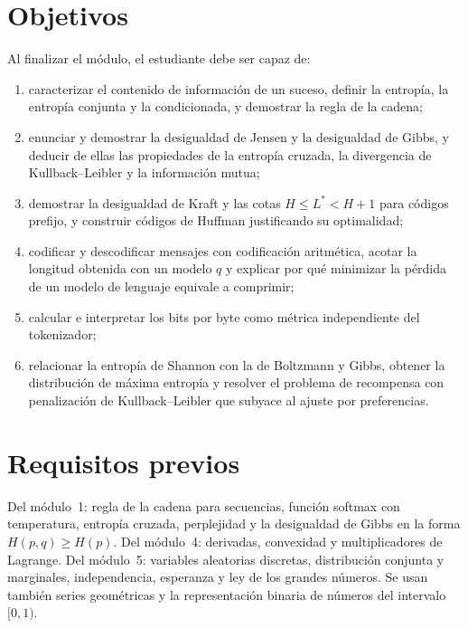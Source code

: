 \documentclass[11pt,a4paper,twoside,openany]{book}
\begin{document}
\section*{Objetivos}
Al finalizar el módulo, el estudiante debe ser capaz de:
\begin{enumerate}[label=\arabic*.]
  \item caracterizar el contenido de información de un suceso, definir la entropía, la entropía conjunta y la condicionada, y demostrar la regla de la cadena;
  \item enunciar y demostrar la desigualdad de Jensen y la desigualdad de Gibbs, y deducir de ellas las propiedades de la entropía cruzada, la divergencia de Kullback--Leibler y la información mutua;
  \item demostrar la desigualdad de Kraft y las cotas $H\le L^{*}<H+1$ para códigos prefijo, y construir códigos de Huffman justificando su optimalidad;
  \item codificar y descodificar mensajes con codificación aritmética, acotar la longitud obtenida con un modelo $q$ y explicar por qué minimizar la pérdida de un modelo de lenguaje equivale a comprimir;
  \item calcular e interpretar los bits por byte como métrica independiente del tokenizador;
  \item relacionar la entropía de Shannon con la de Boltzmann y Gibbs, obtener la distribución de máxima entropía y resolver el problema de recompensa con penalización de Kullback--Leibler que subyace al ajuste por preferencias.
\end{enumerate}

\section*{Requisitos previos}
Del módulo~1: regla de la cadena para secuencias, función softmax con temperatura, entropía cruzada, perplejidad y la desigualdad de Gibbs en la forma $H(p,q)\ge H(p)$. Del módulo~4: derivadas, convexidad y multiplicadores de Lagrange. Del módulo~5: variables aleatorias discretas, distribución conjunta y marginales, independencia, esperanza y ley de los grandes números. Se usan también series geométricas y la representación binaria de números del intervalo $[0,1)$.
\end{document}
